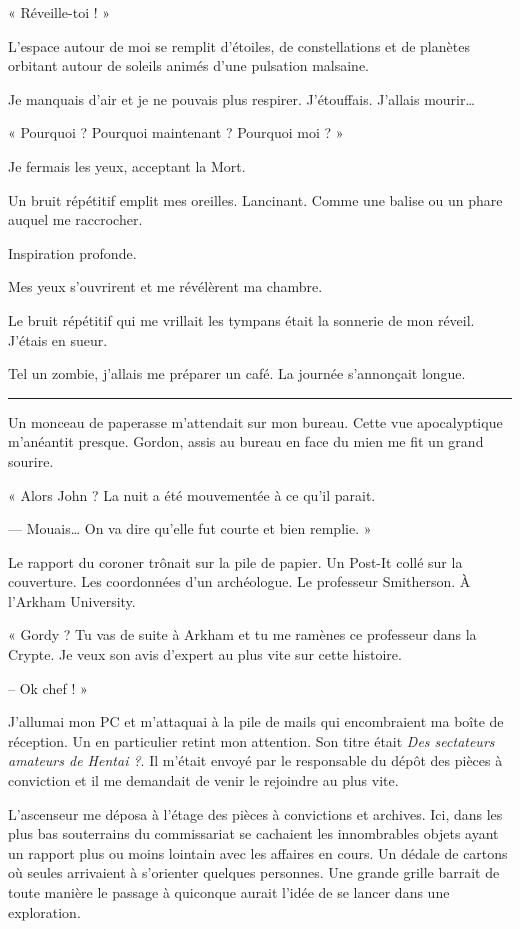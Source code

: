 « Réveille-toi ! »

L'espace autour de moi se remplit d'étoiles, de constellations et de planètes orbitant autour de soleils animés d'une 
pulsation malsaine.

Je manquais d'air et je ne pouvais plus respirer. J'étouffais. J'allais mourir…

« Pourquoi ? Pourquoi maintenant ? Pourquoi moi ? »

Je fermais les yeux, acceptant la Mort.

Un bruit répétitif emplit mes oreilles. Lancinant. Comme une balise ou un phare auquel me raccrocher.

Inspiration profonde.

Mes yeux s'ouvrirent et me révélèrent ma chambre.

Le bruit répétitif qui me vrillait les tympans était la sonnerie de mon réveil. J'étais en sueur.

Tel un zombie, j'allais me préparer un café. La journée s'annonçait longue.

\fancybreak{$* * *$}

Un monceau de paperasse m'attendait sur mon bureau. Cette vue apocalyptique m'anéantit presque. Gordon, assis au bureau 
en face du mien me fit un grand sourire.

« Alors John ? La nuit a été mouvementée à ce qu'il parait.

— Mouais… On va dire qu'elle fut courte et bien remplie. »

Le rapport du coroner trônait sur la pile de papier. Un Post-It collé sur la couverture. Les coordonnées d'un 
archéologue. Le professeur Smitherson. À l'Arkham University.

« Gordy ? Tu vas de suite à Arkham et tu me ramènes ce professeur dans la Crypte. Je veux son avis d'expert au plus 
vite sur cette histoire.

-- Ok chef ! »

J'allumai mon PC et m'attaquai à la pile de mails qui encombraient ma boîte de réception. Un en particulier retint mon 
attention. Son titre était \emph{Des sectateurs amateurs de Hentai ?}. Il m'était envoyé par le responsable du dépôt des
pièces à conviction et il me demandait de venir le rejoindre au plus vite.

L'ascenseur me déposa à l'étage des pièces à convictions et archives. Ici, dans les plus bas souterrains du commissariat se
cachaient les innombrables objets ayant un rapport plus ou moins lointain avec les affaires en cours. Un dédale de
cartons où seules arrivaient à s'orienter quelques personnes. Une grande grille barrait de toute manière le passage à 
quiconque aurait l'idée de se lancer dans une exploration.

